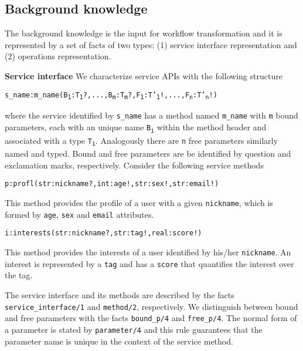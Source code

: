 \subsection{Background knowledge} \label{subsec:kb}
The background knowledge is the input for workflow transformation and it is represented by a set of facts of two types: (1) service interface representation and (2) operations representation.
               
\textbf{Service interface} We characterize service APIs with the following structure
			
{\texttt{s\_name:m\_name(B\textsubscript{1}:T\textsubscript{1}?,...,B\textsubscript{m}:T\textsubscript{m}?,F\textsubscript{1}:T'\textsubscript{1}!,...,F\textsubscript{n}:T'\textsubscript{n}!)}}

where the service identified by \texttt{s\_name} has a method named \texttt{m\_name} with \texttt{m} bound parameters, each with an unique name \texttt{B\textsubscript{i}} within the method header and associated with a type \texttt{T\textsubscript{i}}. Analogously there are \texttt{n} free parameters similarly named and typed. Bound and free parameters are be identified by question and exclamation marks, respectively. Consider the following service methods

{\footnotesize\texttt{p:profl(str:nickname?,int:age!,str:sex!,str:email!)}}

This method provides the profile of a user with a given \texttt{nickname}, which is formed by \texttt{age}, \texttt{sex} and \texttt{email} attributes.

{\footnotesize\texttt{i:interests(str:nickname?,str:tag!,real:score!)}}

This method provides the interests of a user identified by his/her \texttt{nickname}. An interest is represented by a \texttt{tag} and has a \texttt{score} that quantifies the interest over the tag.

The service interface and its methods are described by the facts \texttt{service_interface/1} and \texttt{method/2}, respectively. We distinguish between bound and free parameters with the facts \texttt{bound_p/4} and \texttt{free_p/4}. The normal form of a parameter is stated by \texttt{parameter/4} and this rule guarantees that the parameter name is unique in the context of the service method.

%

